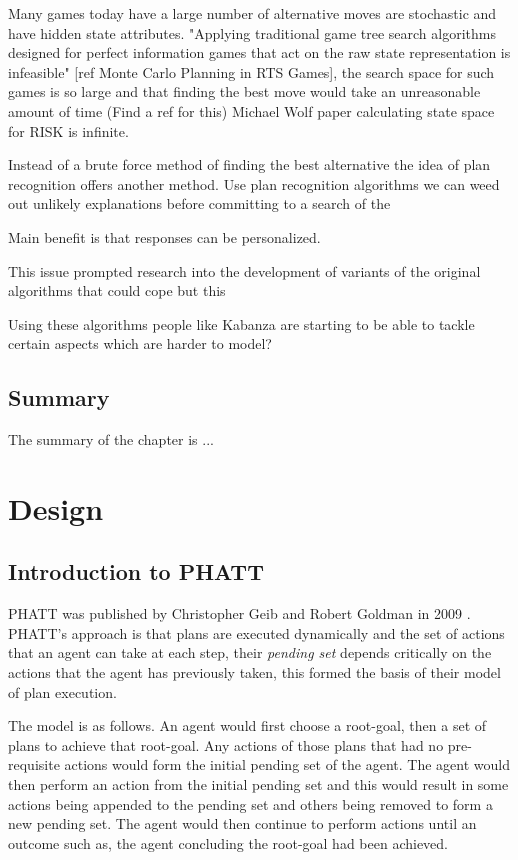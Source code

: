 \documentclass[parskip]{cs4rep}
\begin{document}
Many games today have a large number of alternative moves are stochastic and have hidden state attributes. "Applying traditional game tree search algorithms designed for perfect information games that act on the raw state representation is infeasible" [ref Monte Carlo Planning in RTS Games], the search space for such games is so large and that finding the best move would take an unreasonable amount of time (Find a ref for this) Michael Wolf paper calculating state space for RISK is infinite.

Instead of a brute force method of finding the best alternative the idea of plan recognition offers another method. Use plan recognition algorithms we can weed out unlikely explanations before committing to a search of the 

Main benefit is that responses can be personalized.

This issue prompted research into the development of variants of the original algorithms that could cope but this 

Using these algorithms people like Kabanza are starting to be able to tackle certain aspects which are harder to model?

\section{Summary}

The summary of the chapter is ...

\chapter{Design}

\section{Introduction to PHATT}

PHATT was published by Christopher Geib and Robert Goldman in 2009 \cite{Geib:2009:PPR:1550966.1551246}. PHATT's approach is that plans are executed dynamically and the set of actions that an agent can take at each step, their \textit{pending set} depends critically on the actions that the agent has previously taken, this formed the basis of their model of plan execution.

The model is as follows. An agent would first choose a root-goal, then a set of plans to achieve that root-goal. Any actions of those plans that had no pre-requisite actions would form the initial pending set of the agent. The agent would then perform an action from the initial pending set and this would result in some actions being appended to the pending set and others being removed to form a new pending set. The agent would then continue to perform actions until an outcome such as, the agent concluding the root-goal had been achieved.
\end{document}
